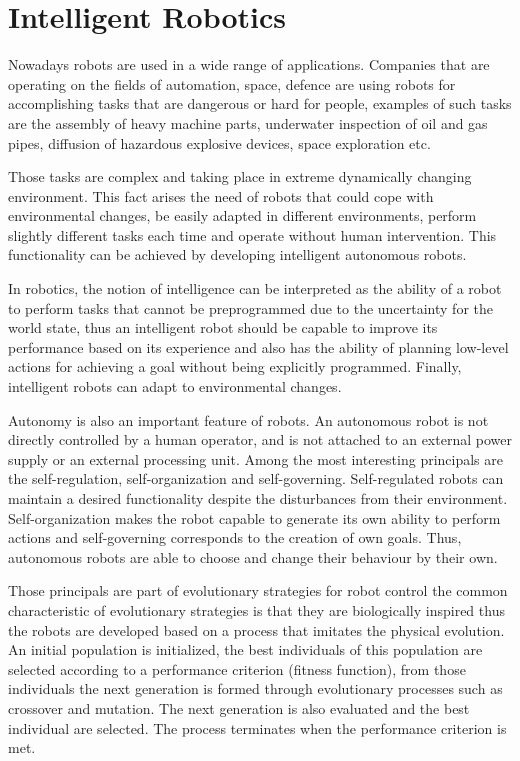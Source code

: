 \documentclass[msc,ai,logo]{infthesis}
\begin{document}
\section{Intelligent Robotics}
Nowadays robots are used in a wide range of applications. Companies that are operating on the fields of automation, space, defence are using robots for accomplishing tasks that are dangerous or hard for people, examples of such tasks are the assembly of heavy machine parts, underwater inspection of oil and gas pipes, diffusion of hazardous explosive devices, space exploration etc.

Those tasks are complex and taking place in extreme dynamically changing environment. This fact arises the need of robots that could cope with environmental changes, be easily adapted in different environments, perform slightly different tasks each time and operate without human intervention. This functionality can be achieved by developing intelligent autonomous robots. 

In robotics, the notion of intelligence can be interpreted as the ability of a robot to perform tasks that cannot be preprogrammed due to the uncertainty for the world state, thus an intelligent robot should be capable to improve its performance based on its experience and also has the ability of planning low-level actions for achieving a goal without being explicitly programmed. Finally, intelligent robots can adapt to environmental changes.

Autonomy is also an important feature of robots. An autonomous robot is not directly controlled by a human operator, and is not attached to an external power supply or an external processing unit. Among the most interesting principals are the self-regulation, self-organization and self-governing. Self-regulated robots can maintain a desired functionality despite the disturbances from their environment. Self-organization makes the robot capable to generate its own ability to perform actions and self-governing corresponds to the creation of own goals. Thus, autonomous robots are able to choose and change their behaviour by their own. 

Those principals are part of evolutionary strategies for robot control \citep{nolfi2000evolutionary} the common characteristic of evolutionary strategies is that they are biologically inspired thus the robots are developed based on a process that imitates the physical evolution. An initial population is initialized, the best individuals of this population are selected according to a performance criterion (fitness function), from those individuals the next generation is formed through evolutionary processes such as crossover and mutation. The next generation is also evaluated and the best individual are selected. The process terminates when the performance criterion is met.
\end{document}
